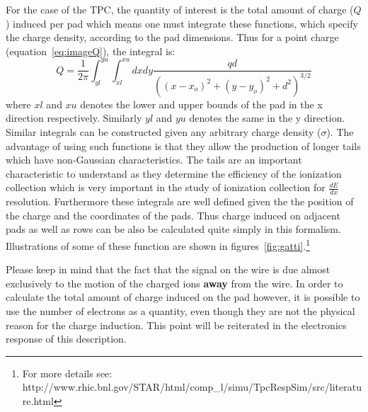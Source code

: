\documentclass{article}
\begin{document}
For the case of the TPC, the quantity of interest is the total
amount of charge ($Q$) induced per pad which means one must integrate
these functions, which specify the charge density, according to the
pad dimensions.  Thus for a point charge (equation~\ref{eq:imageQ}),
the integral is:
\begin{equation}
  Q = \frac{1}{2 \pi} \int_{yl}^{yu} \int_{xl}^{xu} dx dy \frac{q d}{((x-x_{o})^{2} + (y-y_{o})^{2} + d^{2})^{3/2}}
  \label{eq:imageQint}
\end{equation}    
where $xl$ and $xu$ denotes the lower and upper bounds of
the pad in the x direction respectively.  Similarly $yl$ and $yu$
denotes the same in the y
direction.  Similar integrals can be constructed given any
arbitrary charge density ($\sigma$).  The advantage of using such functions
is that they allow the production of longer tails which have
non-Gaussian characteristics.  The tails are an important characteristic
to understand as they determine the efficiency of the ionization
collection which is very important in the
study of ionization collection for $\frac{dE}{dx}$ resolution.
Furthermore these integrals are well defined
given the the position of the charge and the coordinates
of the pads.  Thus charge induced on adjacent pads as well as rows
can be also be calculated quite simply in this formalism.
Illustrations of some of these
function are shown in figures~\ref{fig:gatti}.\footnote{For more
  details see: http://www.rhic.bnl.gov/STAR/html/comp\_l/simu/TpcRespSim/src/literature.html} 

Please keep in mind that the fact that the signal on the wire is
due almost exclusively to the motion of the charged ions {\bf away} from
the wire.  In order to calculate the total amount of charge induced
on the pad however, it is possible to use the number of electrons
as a quantity, even though they are not the physical reason for
the charge induction.  This point will be reiterated in the electronics
response of this description.
\end{document}
